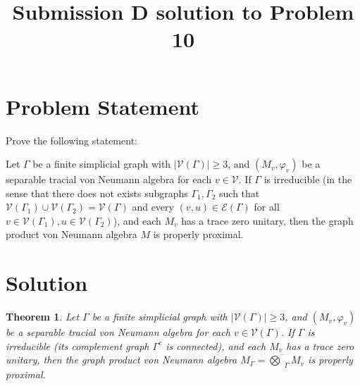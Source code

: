 \documentclass[12pt]{article}
\newtheorem{theorem}{Theorem}
\newcommand{\VV}{\mathcal{V}}
\newcommand{\EE}{\mathcal{E}}
\newcommand{\GG}{\Gamma}
\begin{document}
\title{Submission D solution to Problem 10}
\date{}
\maketitle


\section*{Problem Statement}

Prove the following statement:

Let $\Gamma$ be a finite simplicial graph with $|\VV(\GG)|\geq 3$, and $(M_v,\varphi_v)$ be a separable tracial von Neumann algebra for each $v\in \VV$. If $\Gamma$ is irreducible (in the sense that there does not exists subgraphs $\GG_1,\GG_2$ such that $ \VV(\GG_1)\cup \VV(\GG_2)=\VV(\GG) $ and every $(v,u)\in \EE(\GG) $ for all $v\in\VV(\GG_1),u\in \VV(\GG_2)$), and each $M_v$ has a trace zero unitary, then the graph product von Neumann algebra $M$ is properly proximal.

\section*{Solution}

\begin{theorem}
Let $\Gamma$ be a finite simplicial graph with $|\VV(\Gamma)|\geq 3$, and $(M_v,\varphi_v)$ be a separable tracial von Neumann algebra for each $v\in \VV(\Gamma)$. If $\Gamma$ is irreducible (its complement graph $\Gamma^c$ is connected), and each $M_v$ has a trace zero unitary, then the graph product von Neumann algebra $M_\Gamma = \overline{\bigotimes}_\Gamma M_v$ is properly proximal.
\end{theorem}
\end{document}
